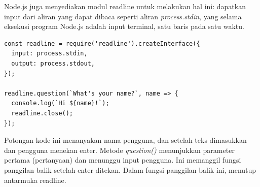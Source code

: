 Node.js juga menyediakan modul readline untuk melakukan hal ini: dapatkan input dari aliran yang dapat dibaca seperti aliran \textit{process.stdin}, yang selama eksekusi program Node.js adalah input terminal, satu baris pada satu waktu.

     \begin{lstlisting}[basicstyle=\ttfamily, frame=single,
        columns=fullflexible, breaklines=true, numbers=none]
const readline = require('readline').createInterface({
  input: process.stdin,
  output: process.stdout,
});

readline.question(`What's your name?`, name => {
  console.log(`Hi ${name}!`);
  readline.close();
});
    \end{lstlisting} 
    Potongan kode ini menanyakan nama pengguna, dan setelah teks dimasukkan dan pengguna menekan enter. Metode \textit{question()} menunjukkan parameter pertama (pertanyaan) dan menunggu input pengguna. Ini memanggil fungsi panggilan balik setelah enter ditekan. Dalam fungsi panggilan balik ini, menutup antarmuka readline.
    
